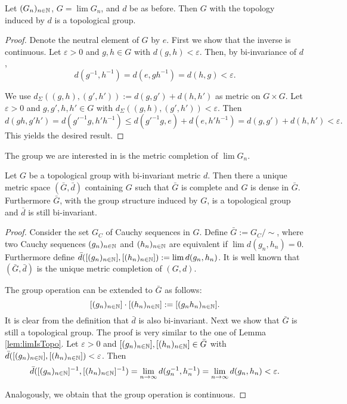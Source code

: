 \begin{lemma}\label{lem:limIsTopo}
	Let $(G_n)_{n\in\mathbb{N}}$, $G=\lim G_n$, and $d$ be as before. Then $G$ with the topology induced by $d$ is a topological group.
\end{lemma}
\begin{proof}
	Denote the neutral element of $G$ by $e$. First we show that the inverse is continuous. Let $\varepsilon>0$ and $g,h\in G$ with $d(g,h)<\varepsilon$. Then, by bi-invariance of $d$,
	\[d(g^{-1},h^{-1})=d(e,gh^{-1})=d(h,g)<\varepsilon.\]
				
	We use $d_\Sigma((g,h),(g',h')):=d(g,g')+d(h,h')$ as metric on $G\times G$. Let $\varepsilon>0$ and $g,g',h,h'\in G$ with $d_\Sigma((g,h),(g',h'))<\varepsilon$. Then
	\[d(gh,g'h')=d(g'^{-1}g,h'h^{-1})\leq d(g'^{-1}g,e)+d(e,h'h^{-1})=d(g,g')+d(h,h')<\varepsilon.\]
	This yields the desired result.
\end{proof}
		
		
The group we are interested in is the metric completion of $\lim G_n$. 
\begin{lemma}\label{lem:climIsTopo}
	Let $G$ be a topological group with bi-invariant metric $d$. Then there a unique metric space $(\bar G,\bar d)$ containing $G$ such that $\bar G$ is complete and $G$ is dense in $\bar G$. Furthermore $\bar G$, with the group structure induced by $G$, is a topological group and $\bar d$ is still bi-invariant.
\end{lemma}
\begin{proof}
	Consider the set $G_C$ of Cauchy sequences in $G$. Define $\bar G:=G_C/\sim$, where two Cauchy sequences $(g_n)_{n\in\mathbb{N}}$ and $(h_n)_{n\in\mathbb{N}}$ are equivalent if $\lim d(g_n,h_n)=0$. Furthermore define $\bar d([(g_n)_{n\in\mathbb{N}}],[(h_n)_{n\in\mathbb{N}}]):=\lim d(g_n,h_n)$. It is well known that $(\bar G,\bar d)$ is the unique metric completion of $(G,d)$.
				
	The group operation can be extended to $\bar G$ as follows:
	\[[(g_n)_{n\in\mathbb{N}}]\cdot[(h_n)_{n\in\mathbb{N}}]:=[(g_nh_n)_{n\in\mathbb{N}}].\]
	It is clear from the definition that $\bar d$ is also bi-invariant. Next we show that $\bar G$ is still a topological group. 
	The proof is very similar to the one of Lemma \ref{lem:limIsTopo}.
	Let $\varepsilon>0$ and $[(g_n)_{n\in\mathbb{N}}],[(h_n)_{n\in\mathbb{N}}]\in\bar G$ with $\bar d([(g_n)_{n\in\mathbb{N}}],[(h_n)_{n\in\mathbb{N}}])<\varepsilon$. Then
	\[\bar d([(g_n)_{n\in\mathbb{N}}]^{-1},[(h_n)_{n\in\mathbb{N}}]^{-1})=\lim_{n\to\infty} d(g_n^{-1},h_n^{-1})=\lim_{n\to\infty} d(g_n,h_n)<\varepsilon. \]
				
	Analogously, we obtain that the group operation is continuous.
\end{proof}
		
